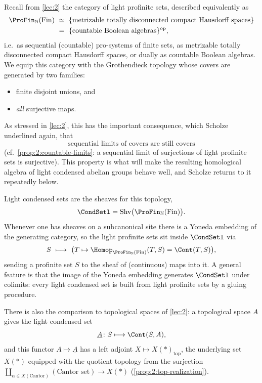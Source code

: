 Recall from \cref{lec:2} the category of light profinite sets, described
equivalently as
\[
\begin{aligned}
\ProFin_{\mathbb{N}}(\mathrm{Fin})
&\ \simeq\ \{\text{metrizable totally disconnected compact Hausdorff spaces}\} \\
&\ =\ \{\text{countable Boolean algebras}\}^{\mathrm{op}},
\end{aligned}
\]
i.e.\ as sequential (countable) pro-systems of finite sets, as metrizable
totally disconnected compact Hausdorff spaces, or dually as countable Boolean
algebras. We equip this category with the Grothendieck topology whose covers are
generated by two families:
\begin{itemize}
\item finite disjoint unions, and
\item \emph{all} surjective maps.
\end{itemize}
As stressed in \cref{lec:2}, this has the important consequence, which Scholze
underlined again, that
\begin{equation}
\label{eq:3:sequential-limits-of-covers}
\text{sequential limits of covers are still covers}
\end{equation}
(cf.\ \cref{prop:2:countable-limits}: a sequential limit of surjections of light
profinite sets is surjective). This property is what will make the resulting
homological algebra of light condensed abelian groups behave well, and Scholze
returns to it repeatedly below.

Light condensed sets are the sheaves for this topology,
\[
\CondSetl=\mathrm{Shv}\bigl(\ProFin_{\mathbb{N}}(\mathrm{Fin})\bigr).
\]
Whenever one has sheaves on a subcanonical site there is a Yoneda embedding of
the generating category, so the light profinite sets sit inside $\CondSetl$ via
\begin{equation*}
S\ \longmapsto\ \bigl(T\mapsto \Homop_{\ProFin_{\mathbb{N}}(\mathrm{Fin})}(T,S)
=\Cont(T,S)\bigr),
\end{equation*}
sending a profinite set $S$ to the sheaf of (continuous) maps into it. A general
feature is that the image of the Yoneda embedding generates $\CondSetl$ under
colimits: every light condensed set is built from light profinite sets by a
gluing procedure.

There is also the comparison to topological spaces of \cref{lec:2}: a
topological space $A$ gives the light condensed set
\begin{equation*}
\underline{A}\colon S\longmapsto \Cont(S,A),
\end{equation*}
and this functor $A\mapsto\underline{A}$ has a left adjoint
$X\mapsto X(*)_{\mathrm{top}}$, the underlying set $X(*)$ equipped with the
quotient topology from the surjection $\coprod_{\alpha\in X(\text{Cantor})}
(\text{Cantor set})\to X(*)$ (\cref{prop:2:top-realization}).

